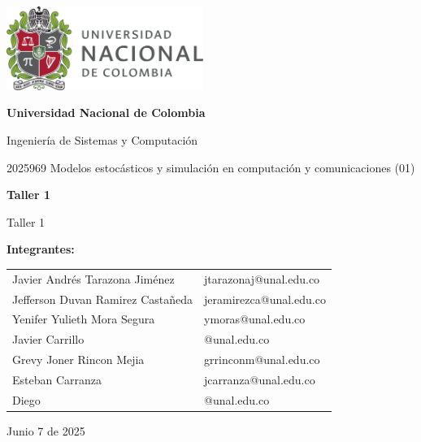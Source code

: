 \documentclass{article}
\begin{document}
\begin{titlepage}
    \centering
    \includegraphics[width=0.48\textwidth]{logo_universidad.png}
    \par\vspace{2cm}

    {\Large \textbf{Universidad Nacional de Colombia} \par}
    \vspace{0.5cm}
    {\large Ingeniería de Sistemas y Computación \par}
    {\large 2025969 Modelos estocásticos y simulación en computación y comunicaciones (01)\par}
    \vspace{3cm}

    {\large \textbf{Taller 1} \par}
    {\large Taller 1 \par}
    \vspace{3cm}

    {\large \textbf{Integrantes:} \par}
    \vspace{0.5cm}
    \begin{tabular}{ll}
    Javier Andrés Tarazona Jiménez & jtarazonaj@unal.edu.co \\
    Jefferson Duvan Ramirez Castañeda & jeramirezca@unal.edu.co \\
    Yenifer Yulieth Mora Segura & ymoras@unal.edu.co \\
    Javier Carrillo & @unal.edu.co \\
    Grevy Joner Rincon Mejia & grrinconm@unal.edu.co \\
    Esteban Carranza & jcarranza@unal.edu.co \\
    Diego & @unal.edu.co \\
    \end{tabular}
    \par\vspace{3cm}

    {\large Junio 7 de 2025 \par}
\end{titlepage}
\end{document}
